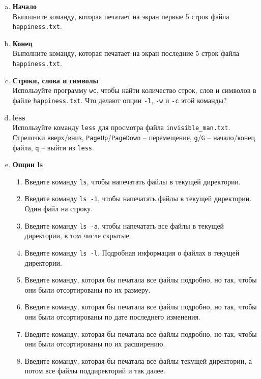 \documentclass{article}
\begin{document}
\begin{enumerate}[a.]
\item \textbf{Начало}\\
Выполните команду, которая печатает на экран первые 5 строк файла \texttt{happiness.txt}.

\item \textbf{Конец}\\
Выполните команду, которая печатает на экран последние 5 строк файла \texttt{happiness.txt}.

\item \textbf{Строки, слова и символы}\\
Используйте программу \texttt{wc}, чтобы найти количество строк, слов и символов в файле \texttt{happiness.txt}.
Что делают опции \texttt{-l}, \texttt{-w} и \texttt{-c} этой команды?

\item \textbf{less}\\
Используйте команду \texttt{less} для просмотра файла \texttt{invisible\_man.txt}.\\
Стрелочки вверх/вниз, \texttt{PageUp}/\texttt{PageDown} -- перемещение, \texttt{g}/\texttt{G} -- начало/конец файла, \texttt{q} -- выйти из \texttt{less}.
\item \textbf{Опции ls}
\begin{enumerate}
\item Введите команду \texttt{ls}, чтобы напечатать файлы в текущей директории.
\item Введите команду \texttt{ls -1}, чтобы напечатать файлы в текущей директории. Один файл на строку.
\item Введите команду \texttt{ls -a}, чтобы напечатать все файлы в текущей директории, в том числе скрытые.
\item Введите команду \texttt{ls -l}. Подробная информация о файлах в текущей директории.
\item Введите команду, которая бы печатала все файлы подробно, но так, чтобы они были отсортированы по их размеру.
\item Введите команду, которая бы печатала все файлы подробно, но так, чтобы они были отсортированы по дате последнего изменения.
\item Введите команду, которая бы печатала все файлы подробно, но так, чтобы они были отсортированы по их расширению.
\item Введите команду, которая бы печатала все файлы текущей директории, а потом все файлы поддиректорий и так далее.
\end{enumerate}
\end{enumerate}
\end{document}
